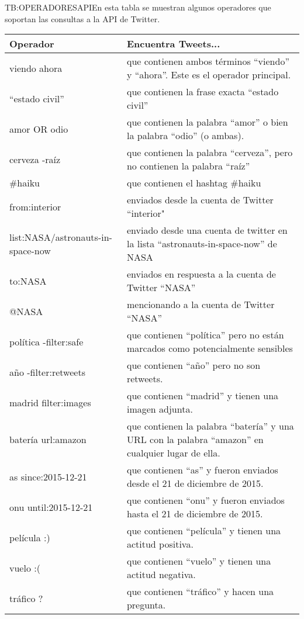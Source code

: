 \begin{table}[Operadores de Twitter API]{TB:OPERADORESAPI}{En esta tabla se muestran algunos operadores que soportan las consultas a la API de Twitter.}
\begin{tabular}{|p{3.5cm}|p{11.5cm}|}
\hline
\textbf{Operador} & \textbf{Encuentra Tweets...} \\
\hline \hline
viendo ahora & que contienen ambos términos ``viendo'' y ``ahora''. Este es el operador principal.\\
``estado civil'' & que contienen la frase exacta ``estado civil''\\
amor OR odio & que contienen la palabra ``amor'' o bien la palabra ``odio'' (o ambas).\\
cerveza -raíz & que contienen la palabra ``cerveza'', pero no contienen la palabra ``raíz''\\
\#haiku & que contienen el hashtag \#haiku \\
from:interior & enviados desde la cuenta de Twitter ``interior"\\
list:NASA/astronauts-in-space-now & enviado desde una cuenta de twitter en la lista ``astronauts-in-space-now'' de NASA\\
to:NASA & enviados en respuesta a la cuenta de Twitter ``NASA''\\
@NASA & mencionando a la cuenta de Twitter ``NASA''\\
política -filter:safe & que contienen ``política'' pero no están marcados como potencialmente sensibles \\
año -filter:retweets & que contienen ``año'' pero no son retweets.\\
madrid filter:images & que contienen ``madrid'' y tienen una imagen adjunta.\\
batería url:amazon & que contienen la palabra ``batería'' y una URL con la palabra ``amazon'' en cualquier lugar de ella.\\
as since:2015-12-21 & que contienen ``as'' y fueron enviados desde el 21 de diciembre de 2015.\\
onu until:2015-12-21 & que contienen ``onu'' y fueron enviados hasta el 21 de diciembre de 2015.\\
película :) & que contienen ``película'' y tienen una actitud positiva.\\
vuelo :( & que contienen ``vuelo'' y tienen una actitud negativa.\\
tráfico ? & que contienen ``tráfico'' y hacen una pregunta. \\
\hline
\end{tabular}
\end{table}

